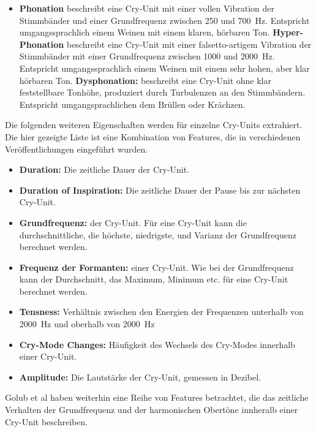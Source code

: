 \begin{itemize}
	 \item \textbf{Phonation} beschreibt eine Cry-Unit mit einer \glqq vollen Vibration der Stimmbänder\grqq{} und einer Grundfrequenz zwischen 250 und \SI{700}{\hertz}. Entspricht umgangssprachlich einem Weinen mit einem \glqq klaren, hörbaren Ton\grqq{}.
	 \textbf{Hyper-Phonation} beschreibt eine Cry-Unit mit einer \glqq falsetto-artigem Vibration der Stimmbänder\grqq{} mit einer Grundfrequenz zwischen 1000 und \SI{2000}{\hertz}. Entspricht umgangssprachlich einem Weinen mit einem \glqq sehr hohen, aber klar hörbaren Ton\grqq{}.
	 \textbf{Dysphonation:} beschreibt eine Cry-Unit ohne klar feststellbare Tonhöhe, produziert durch Turbulenzen an den Stimmbändern. Entspricht umgangsprachlichen dem \glqq Brüllen oder Krächzen\grqq{}.
\end{itemize}

Die folgenden weiteren Eigenschaften werden für einzelne Cry-Units extrahiert. Die hier gezeigte Liste ist eine Kombination von Features, die in verschiedenen Veröffentlichungen eingeführt wurden.

\begin{itemize}
	\item \textbf{Duration:} Die zeitliche Dauer der Cry-Unit.
	\item \textbf{Duration of Inspiration: }Die zeitliche Dauer der Pause bis zur nächsten Cry-Unit.
	\item \textbf{Grundfrequenz:} der Cry-Unit. Für eine Cry-Unit kann die durchschnittliche, die höchste, niedrigste, und Varianz der Grundfrequenz berechnet werden.
	\item \textbf{Frequenz der Formanten:} einer Cry-Unit. Wie bei der Grundfrequenz kann der Durchschnitt, das Maximum, Minimum etc. für eine Cry-Unit berechnet werden.
	\item \textbf{Tensness:} Verhältnis zwischen den Energien der Frequenzen unterhalb von \SI{2000}{\hertz} und oberhalb von \SI{2000}{\hertz}
	\item \textbf{Cry-Mode Changes:} Häufigkeit des Wechsels des Cry-Modes innerhalb einer Cry-Unit.
	\item \textbf{Amplitude:} Die Lautstärke der Cry-Unit, gemessen in Dezibel. \cite[S. 85]{parentalPerception} \cite[S. 156]{threeCryTypes}
\end{itemize}

Golub et al haben weiterhin eine Reihe von Features betrachtet, die das zeitliche Verhalten der Grundfrequenz und der harmonischen Obertöne innheralb einer Cry-Unit beschreiben. \cite[S. 73]{cryModel}

